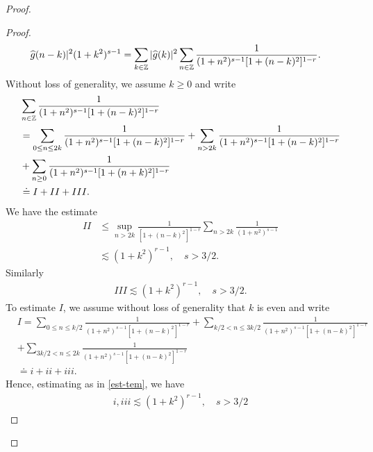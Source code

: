 \begin{proof}
\begin{proof}
\begin{equation}
\begin{split}
{\widehat{g}(n - k) |^{2}}{(1 + k^{2})^{s-1}}
& = \sum_{k \in \mathbb{Z}}| \widehat{g}(k) |^{2} \sum_{n \in \mathbb{Z}}  
\frac{1}{(1 + n^{2})^{s-1}[1 + (n - k)^{2}]^{1-r}}.  
\end{split}
\end{equation}
%
Without loss of generality, we assume $k \ge 0$ and write 
\begin{equation*}
\begin{split}
&  \sum_{n \in \mathbb{Z}}  
\frac{1}{(1 + n^{2})^{s-1}[1 + (n - k)^{2}]^{1-r}}  
\\
& = 
\sum_{0 \le n \le 2k} \frac{1}{(1 + n^{2})^{s-1}[1 + (n - k)^{2}]^{1-r}} 
+ \sum_{n > 2k} \frac{1}{(1 + n^{2})^{s-1}[1 + (n - k)^{2}]^{1-r}}
\\
& + \sum_{n \ge 0} \frac{1}{(1 + n^{2})^{s-1}[1 + (n + k)^{2}]^{1-r}} 
\\
& \doteq I + II + III.
\end{split} 
\end{equation*}
%
We have the estimate
%
%
\begin{equation}
\label{est-tem}
\begin{split}
II 
& \le \sup_{n > 2k} \frac{1}{\left[ 1 + (n-k)^{2} \right]^{1-r}}
\sum_{n > 2k} \frac{1}{(1 + n^{2})^{s-1}} 
\\
& \lesssim (1 + k^{2})^{r-1}, \quad
s > 3/2.
\end{split}
\end{equation}
Similarly
%
%
\begin{equation*}
\begin{split}
III \lesssim (1 + k^{2})^{r-1}, \quad s > 3/2.
\end{split}
\end{equation*}
%
%
%
To estimate $I$, we assume without loss of generality that $k$ is even and write
%
%
\begin{equation*}
\begin{split}
&  I = \sum_{0 \le n \le k/2} \frac{1}{(1 + n^{2})^{s-1}[1 + (n - k)^{2}]^{1-r}} 
+ \sum_{k/2 < n \le 3k/2} \frac{1}{(1 + n^{2})^{s-1}[1 + (n - k)^{2}]^{1-r}} 
\\
& + \sum_{3k/2 < n \le 2k} \frac{1}{(1 + n^{2})^{s-1}[1 + (n - k)^{2}]^{1-r}} 
\\
& \doteq i + ii + iii.
\end{split} 
\end{equation*}
Hence, estimating as in \eqref{est-tem}, we have
%
%
\begin{equation*}
\begin{split}
i, iii \lesssim (1 + k^{2})^{r-1}, \quad
s > 3/2

\end{split}
\end{equation*}
\end{proof}
\end{proof}
